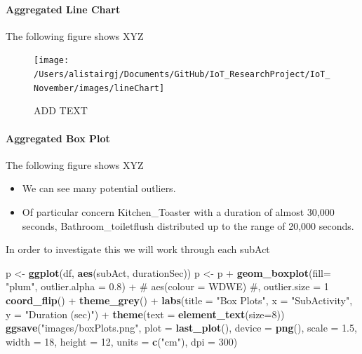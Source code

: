 \documentclass[11pt,]{article}
\newenvironment{Shaded}{\begin{snugshade}}{\end{snugshade}}
\newcommand{\CommentTok}[1]{\textcolor[rgb]{0.54,0.53,0.53}{#1}}
\newcommand{\DataTypeTok}[1]{\textcolor[rgb]{0.00,0.34,0.68}{#1}}
\newcommand{\DecValTok}[1]{\textcolor[rgb]{0.69,0.50,0.00}{#1}}
\newcommand{\FloatTok}[1]{\textcolor[rgb]{0.69,0.50,0.00}{#1}}
\newcommand{\KeywordTok}[1]{\textcolor[rgb]{0.12,0.11,0.11}{\textbf{#1}}}
\newcommand{\NormalTok}[1]{\textcolor[rgb]{0.12,0.11,0.11}{#1}}
\newcommand{\OperatorTok}[1]{\textcolor[rgb]{0.12,0.11,0.11}{#1}}
\newcommand{\StringTok}[1]{\textcolor[rgb]{0.75,0.01,0.01}{#1}}
\providecommand{\tightlist}{%
  \setlength{\itemsep}{0pt}\setlength{\parskip}{0pt}}
\let\oldparagraph\paragraph
\renewcommand{\paragraph}[1]{\oldparagraph{#1}\mbox{}}
\begin{document}
\hypertarget{aggregated-line-chart}{%
\paragraph{Aggregated Line Chart}\label{aggregated-line-chart}}

The following figure shows XYZ

\begin{figure}[H]
\texttt{[image: /Users/alistairgj/Documents/GitHub/IoT\_ResearchProject/IoT\_November/images/lineChart]} \caption{ADD TEXT}\label{fig:unnamed-chunk-17}
\end{figure}

\hypertarget{aggregated-box-plot}{%
\paragraph{Aggregated Box Plot}\label{aggregated-box-plot}}

The following figure shows XYZ

\begin{itemize}
\tightlist
\item
  We can see many potential outliers.
\item
  Of particular concern Kitchen\_Toaster with a duration of almost
  30,000 seconds, Bathroom\_toiletflush distributed up to the range of
  20,000 seconds.
\end{itemize}

In order to investigate this we will work through each subAct

\begin{Shaded}
\begin{Highlighting}[]
\NormalTok{p <-}\StringTok{ }\KeywordTok{ggplot}\NormalTok{(df, }\KeywordTok{aes}\NormalTok{(subAct, durationSec))}
\NormalTok{p <-}\StringTok{ }\NormalTok{p }\OperatorTok{+}\StringTok{ }\KeywordTok{geom_boxplot}\NormalTok{(}\DataTypeTok{fill=} \StringTok{"plum"}\NormalTok{, }\DataTypeTok{outlier.alpha =} \FloatTok{0.8}\NormalTok{) }\OperatorTok{+}\StringTok{ }\CommentTok{# aes(colour = WDWE) #, outlier.size = 1}
\StringTok{  }\KeywordTok{coord_flip}\NormalTok{() }\OperatorTok{+}\StringTok{ }\KeywordTok{theme_grey}\NormalTok{() }\OperatorTok{+}
\StringTok{  }\KeywordTok{labs}\NormalTok{(}\DataTypeTok{title =} \StringTok{"Box Plots"}\NormalTok{,}
       \DataTypeTok{x =} \StringTok{"SubActivity"}\NormalTok{,}
       \DataTypeTok{y =} \StringTok{"Duration (sec)"}\NormalTok{) }\OperatorTok{+}\StringTok{ }\KeywordTok{theme}\NormalTok{(}\DataTypeTok{text =} \KeywordTok{element_text}\NormalTok{(}\DataTypeTok{size=}\DecValTok{8}\NormalTok{))}
\KeywordTok{ggsave}\NormalTok{(}\StringTok{"images/boxPlots.png"}\NormalTok{, }\DataTypeTok{plot =} \KeywordTok{last_plot}\NormalTok{(), }\DataTypeTok{device =} \KeywordTok{png}\NormalTok{(), }
       \DataTypeTok{scale =} \FloatTok{1.5}\NormalTok{, }\DataTypeTok{width =} \DecValTok{18}\NormalTok{, }\DataTypeTok{height =} \DecValTok{12}\NormalTok{, }\DataTypeTok{units =} \KeywordTok{c}\NormalTok{(}\StringTok{"cm"}\NormalTok{), }\DataTypeTok{dpi =} \DecValTok{300}\NormalTok{)}
\end{Highlighting}
\end{Shaded}
\end{document}
